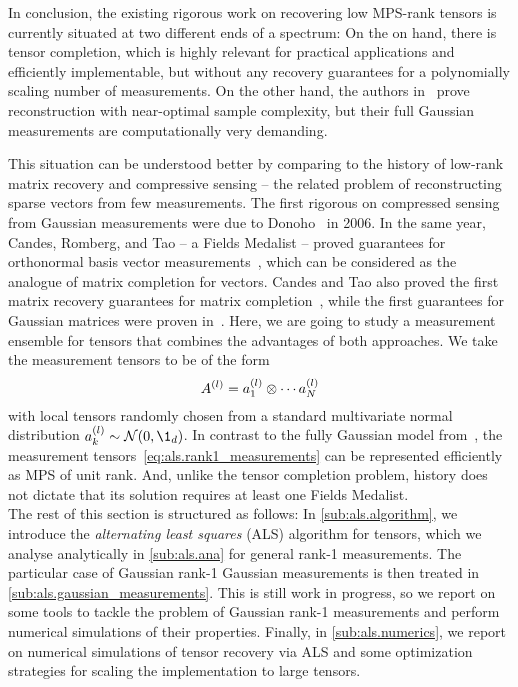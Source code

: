 In conclusion, the existing rigorous work on recovering low MPS-rank tensors is currently situated at two different ends of a spectrum:
On the on hand, there is tensor completion, which is highly relevant for practical applications and efficiently implementable, but without any recovery guarantees for a polynomially scaling number of measurements.
On the other hand, the authors in~\cite{Rauhut_2014_Tensor} prove reconstruction with near-optimal sample complexity, but their full Gaussian measurements are computationally very demanding.

This situation can be understood better by comparing to the history of low-rank matrix recovery and compressive sensing -- the related problem of reconstructing sparse vectors from few measurements.
The first rigorous on compressed sensing from Gaussian measurements were due to Donoho~\cite{Donoho_2006_For} in 2006.
In the same year, Candes, Romberg, and Tao -- a Fields Medalist -- proved guarantees for orthonormal basis vector measurements~\cite{Candes_2006_Stable}, which can be considered as the analogue of matrix completion for vectors.
Candes and Tao also proved the first matrix recovery guarantees for matrix completion~\cite{Candes_2010_Power}, while the first guarantees for Gaussian matrices were proven in~\cite{Recht_2010_Guaranteed}.
Here, we are going to study a measurement ensemble for tensors that combines the advantages of both approaches.
We take the measurement tensors to be of the form
\[
  A^{(l)} = a^{(l)}_1 \otimes \cdots a^{(l)}_N
  \label{eq:als.rank1_measurements}
\]
with local tensors randomly chosen from a standard multivariate normal distribution $a\ind{l}_k \sim \Normal(0, \1_d)$.
In contrast to the fully Gaussian model from~\cite{Rauhut_2014_Tensor,Rauhut_2016_Low}, the measurement tensors~\eqref{eq:als.rank1_measurements} can be represented efficiently as MPS of unit rank.
And, unlike the tensor completion problem, history does not dictate that its solution requires at least one Fields Medalist.\\



The rest of this section is structured as follows:
In \cref{sub:als.algorithm}, we introduce the \emph{alternating least squares} (ALS) algorithm for tensors, which we analyse analytically in \cref{sub:als.ana} for general rank-1 measurements.
The particular case of Gaussian rank-1 Gaussian measurements is then treated in \cref{sub:als.gaussian_measurements}.
This is still work in progress, so we report on some tools to tackle the problem of Gaussian rank-1 measurements and perform numerical simulations of their properties.
Finally, in \cref{sub:als.numerics}, we report on numerical simulations of tensor recovery via ALS and some optimization strategies for scaling the implementation to large tensors.



